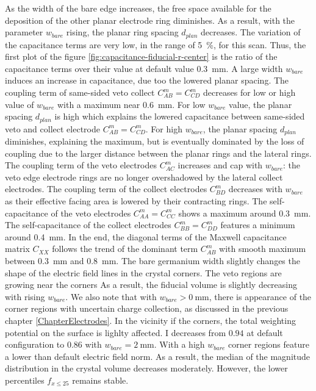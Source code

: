 As the width of the bare edge increases, the free space available for the deposition of the other planar electrode ring diminishes. As a result, with the parameter $w_{bare}$ rising, the planar ring spacing $d_{plan}$ decreases.  
The variation of the capacitance terms are very low, in the range of \SI{5}{\percent}, for this scan. Thus, the first plot of the figure \ref{fig:capacitance-fiducial-r-center} is the ratio of the capacitance terms over their value at default value \SI{0.3}{\mm}. A large width $w_{bare}$ induces an increase in capacitance, due too the lowered planar spacing.
The coupling term of same-sided veto collect $C_{AB}^m=C_{CD}^m$ decreases for low or high value of $w_{bare}$ with a maximum near \SI{0.6}{\mm}. For low $w_{bare}$ value, the planar spacing $d_{plan}$ is high which explains the lowered capacitance between same-sided veto and collect electrode $C_{AB}^m=C_{CD}^m$. For high $w_{bare}$, the planar spacing $d_{plan}$ diminishes, explaining the maximum, but is eventually dominated by the loss of coupling due to the larger distance between the planar rings and the lateral rings. The coupling term of the veto electrodes $C_{AC}^m$ increases and cap with $w_{bare}$: the veto edge electrode rings are no longer overshadowed by the lateral collect electrodes. The coupling term of the collect electrodes $C_{BD}^m$ decreases with $w_{bare}$ as their effective facing area is lowered by their contracting rings. The self-capacitance of the veto electrodes $C_{AA}^m = C_{CC}^m$ shows a maximum around \SI{0.3}{\mm}. The self-capacitance of the collect electrodes $C_{BB}^m = C_{DD}^m$ features a minimum around \SI{0.4}{\mm}. In the end, the diagonal terms of the Maxwell capacitance matrix $C_{XX}$ follows the trend of the dominant term $C_{AB}^m$ with smooth maximum between 
\SI{0.3}{\mm} and \SI{0.8}{\mm}.
The bare germanium width slightly changes the shape of the electric field lines in the crystal corners. The veto regions are growing near the corners As a result, the fiducial volume is slightly decreasing with rising $w_{bare}$. We also note that with $w_{bare} > \SI{0}{\mm}$, there is appearance of the corner regions with uncertain charge collection, as discussed in the previous chapter \ref{ChapterElectrodes}. 
In the vicinity if the corners, the total weighting potential on the surface is lighlty affected. I decreases from $0.94$ at default configuration to $0.86$ with $w_{bare} = \SI{2}{\mm}$.
With a high $w_{bare}$ corner regions feature a lower than default electric field norm. As a result, the median of the magnitude distribution in the crystal volume decreases moderately. However, the lower percentiles $f_{x \leq 25}$ remains stable.

